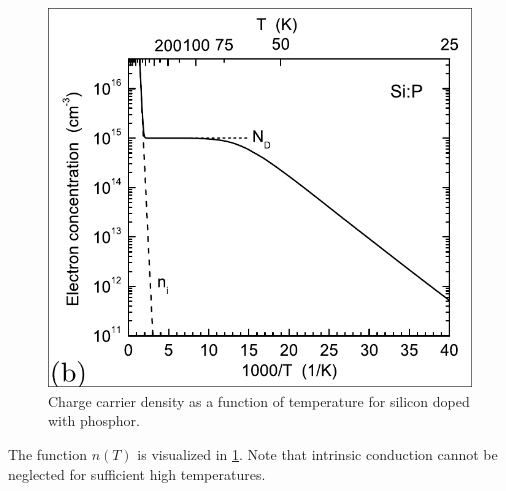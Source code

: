 \begin{figure}
	\centering
	\includegraphics[width=0.6\linewidth]{../assets/charge_carrier_density_temperature.png}
	\caption{Charge carrier density as a function of temperature for 
	silicon doped with phosphor. }
	\label{fig:carrier_temperature}
\end{figure}
The function $n(T)$ is visualized in \cref{fig:carrier_temperature}.
Note that intrinsic conduction cannot be neglected for sufficient high
temperatures.
